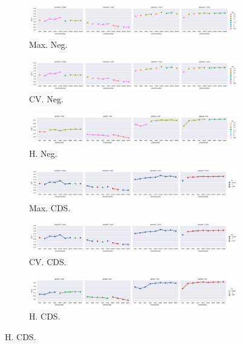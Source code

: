 \begin{landscape}
\begin{figure}
  \begin{subfigure}[t]{0.49\textwidth}
    \includegraphics[width=\textwidth]{supplement/figures/GS11-max_-selection-neg}
    \caption{Max. Neg.}
    \label{fig:}
  \end{subfigure}
  \begin{subfigure}[t]{0.49\textwidth}
    \includegraphics[width=\textwidth]{supplement/figures/GS11-cross_validation-selection-neg}
    \caption{CV. Neg.}
    \label{fig:}
  \end{subfigure}
  \begin{subfigure}[t]{0.49\textwidth}
    \includegraphics[width=\textwidth]{supplement/figures/GS11-heuristics-selection-neg}
    \caption{H. Neg.}
    \label{fig:}
  \end{subfigure}

  \begin{subfigure}[t]{0.49\textwidth}
    \includegraphics[width=\textwidth]{supplement/figures/GS11-max_-selection-cds}
    \caption{Max. CDS.}
    \label{fig:}
  \end{subfigure}
  \begin{subfigure}[t]{0.49\textwidth}
    \includegraphics[width=\textwidth]{supplement/figures/GS11-cross_validation-selection-cds}
    \caption{CV. CDS.}
    \label{fig:}
  \end{subfigure}
  \begin{subfigure}[t]{0.49\textwidth}
    \includegraphics[width=\textwidth]{supplement/figures/GS11-heuristics-selection-cds}
    \caption{H. CDS.}
    \label{fig:}
  \end{subfigure}


\end{figure}
\end{landscape}

